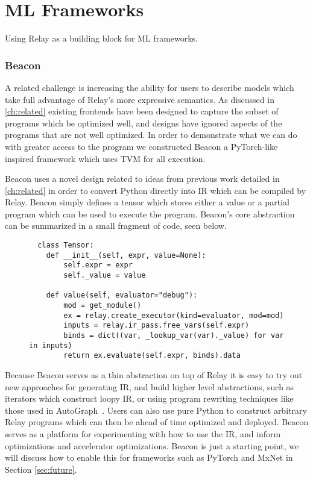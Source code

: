 \chapter{ML Frameworks}
\label{ch:frameworks}

Using Relay as a building block for ML frameworks.


\subsection{Beacon}

A related challenge is increasing the ability for users to describe models which take
  full advantage of Relay's more expressive semantics.
As discussed in \ref{ch:related} existing frontends have been designed to capture the
  subset of programs which be optimized well, and designs have ignored aspects of the
  programs that are not well optimized.
In order to demonstrate what we can do with greater access to the program we constructed
  Beacon a PyTorch-like inspired framework which uses TVM for all execution.

Beacon uses a novel design related to ideas from previous work detailed in \ref{ch:related}
  in order to convert Python directly into IR which can be compiled by Relay.
Beacon simply defines a tensor which stores either a value or a partial program
  which can be used to execute the program.
Beacon's core abstraction can be summarized in a small fragment of code, seen below.

\begin{figure}
\begin{verbatim}
  class Tensor:
    def __init__(self, expr, value=None):
        self.expr = expr
        self._value = value

    def value(self, evaluator="debug"):
        mod = get_module()
        ex = relay.create_executor(kind=evaluator, mod=mod)
        inputs = relay.ir_pass.free_vars(self.expr)
        binds = dict((var, _lookup_var(var)._value) for var in inputs)
        return ex.evaluate(self.expr, binds).data
\end{verbatim}
\end{figure}

Because Beacon serves as a thin abstraction on top of Relay it
  is easy to try out new approaches for generating IR, and build
  higher level abstractions, such as iterators which construct
  loopy IR, or using program rewriting techniques like those
  used in AutoGraph~\citep{AutoGraph}.
Users can also use pure Python to construct arbitrary Relay
  programs which can then be ahead of time optimized and
  deployed.
Beacon serves as a platform for experimenting with how
  to use the IR, and inform optimizations and accelerator optimizations.
Beacon is just a starting point, we will discuss how to enable this for frameworks
  such as PyTorch and MxNet in Section \ref{sec:future}.
